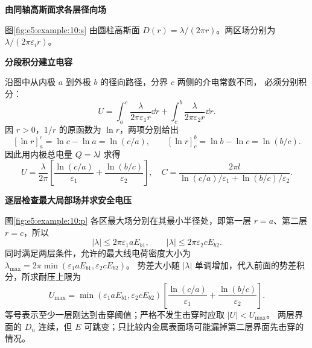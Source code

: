 \begin{solution}\textbf{由同轴高斯面求各层径向场}\par\nobreak
图\ref{fig:e5:example:10:s} 由圆柱高斯面 $D(r)=\lambda/(2\pi r)$。两区场分别为 $\lambda/(2\pi\varepsilon_i r)$。

\par\medskip{}\noindent\textbf{分段积分建立电容}\par\nobreak
沿图中从内极 $a$ 到外极 $b$ 的径向路径，分界 $c$ 两侧的介电常数不同，
必须分别积分：
\[
 U=\int_a^c\frac{\lambda}{2\pi\varepsilon_1r}\dd r
   +\int_c^b\frac{\lambda}{2\pi\varepsilon_2r}\dd r.
\]
因 $r>0$，$1/r$ 的原函数为 $\ln r$，两项分别给出
\[
 [\ln r]_a^c=\ln c-\ln a=\ln(c/a),\qquad
 [\ln r]_c^b=\ln b-\ln c=\ln(b/c).
\]
因此用内极总电量 $Q=\lambda l$ 求得
\[
 U=\frac{\lambda}{2\pi}\left[\frac{\ln(c/a)}{\varepsilon_1}
 +\frac{\ln(b/c)}{\varepsilon_2}\right],\quad
 C=\frac{2\pi l}{\ln(c/a)/\varepsilon_1+\ln(b/c)/\varepsilon_2}.
\]



\par\medskip{}\noindent\textbf{逐层检查最大局部场并求安全电压}\par\nobreak
图\ref{fig:e5:example:10:p} 各区最大场分别在其最小半径处，即第一层 $r=a$、第二层 $r=c$，所以
\[
 |\lambda|\le2\pi\varepsilon_1aE_{b1},\qquad
 |\lambda|\le2\pi\varepsilon_2cE_{b2}.
\]
同时满足两层条件，允许的最大线电荷密度大小为
$\lambda_{\max}=2\pi\min(\varepsilon_1aE_{b1},\varepsilon_2cE_{b2})$。
势差大小随 $|\lambda|$ 单调增加，代入前面的势差积分，所求耐压上限为
\[
 \boxed{U_{\max}=\min(\varepsilon_1aE_{b1},\varepsilon_2cE_{b2})
 \left[\frac{\ln(c/a)}{\varepsilon_1}+\frac{\ln(b/c)}{\varepsilon_2}\right]}.
\]
等号表示至少一层刚达到击穿阈值；严格不发生击穿时应取 $|U|<U_{\max}$。
两层界面的 $D_n$ 连续，但 $E$ 可跳变；只比较内金属表面场可能漏掉第二层界面先击穿的情况。\end{solution}
